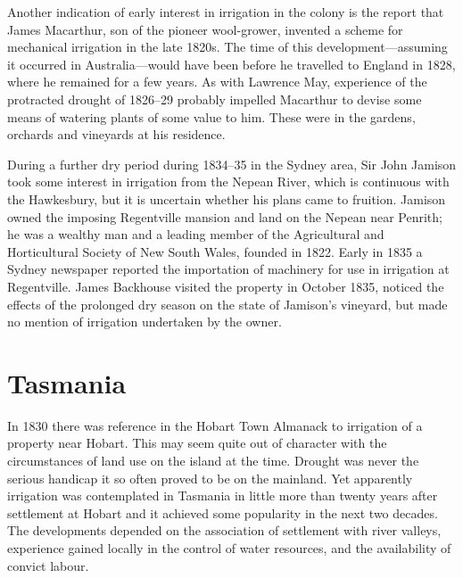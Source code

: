 Another indication of early interest in irrigation in the colony is
the report that James Macarthur, son of the pioneer wool-grower,
invented a scheme for mechanical irrigation in the late
1820s. The time
of this development---assuming it occurred in Australia---would have
been before he travelled to England in 1828, where he remained for a
few years.  As with Lawrence May, experience of the protracted drought
of 1826--29 probably impelled Macarthur to devise some means of
watering plants of some value to him.  These were in the gardens,
orchards and vineyards at his residence.

During a further dry period during 1834--35 in the Sydney area, Sir
John Jamison took some interest in irrigation from the Nepean River,
which is continuous with the Hawkesbury, but it is uncertain whether
his plans came to fruition.  Jamison owned the imposing Regentville
mansion and land on the Nepean near Penrith; he was a wealthy man and
a leading member of the Agricultural and Horticultural Society of New
South Wales, founded in 1822.  Early in 1835 a Sydney newspaper
reported the importation of machinery for use in irrigation at
Regentville.  James Backhouse
visited the property in October 1835, noticed the effects of the
prolonged dry season on the state of Jamison's vineyard, but made no
mention of irrigation undertaken by the owner.

\section*{Tasmania}

In 1830 there was reference in the Hobart Town Almanack to irrigation
of a property near Hobart.  This may seem quite out of character with
the circumstances of land use on the island at the time.  Drought was
never the serious handicap it so often proved to be on the mainland.
Yet apparently irrigation was contemplated in Tasmania in little more
than twenty years after settlement at Hobart and it achieved some
popularity in the next two decades.  The developments depended on the
association of settlement with river valleys, experience gained
locally in the control of water resources, and the availability of
convict labour.

